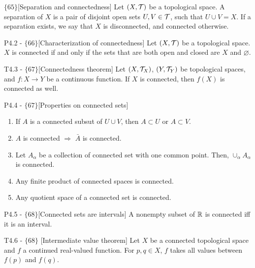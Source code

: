 \documentclass{article}
\begin{document}
\begin{flexidefinition}{$\{65\}$}[Separation and connectedness]
    Let $(X,\mathcal{T})$ be a topological space. A separation of $X$ is a pair of disjoint open sets $U,V \in \mathcal{T}$, such that $U \cup V = X$. If a separation exists, we say that $X$ is disconnected, and connected otherwise.
\end{flexidefinition}
\begin{flexilemma}{P4.2 - $\{66\}$}[Characterization of connectedness]
    Let $(X,\mathcal{T})$ be a topological space. $X$ is connected if and only if the sets that are both open and closed are $X$ and $\varnothing$.
\end{flexilemma}
\begin{flexitheorem}{T4.3 - $\{67\}$}[Connectedness theorem]
    Let $(X,\mathcal{T}_X)$, $(Y,\mathcal{T}_Y)$ be topological spaces, and $f: X \to Y$ be a continuous function. If $X$ is connected, then $f(X)$ is connected as well.
\end{flexitheorem}
\begin{flexilemma}{P4.4 - $\{67\}$}[Properties on connected sets]
    \begin{enumerate}[label=(\alph*)]
        \item If $A$ is a connected subsut of $U\cup V$, then $A\subset U$ or $A \subset V$.
        \item $A$ is connected $\Rightarrow$ $\bar A$ is connected.
        \item Let $A_\alpha$ be a collection of connected set with one common point. Then, $\cup_{\alpha} A_\alpha$ is connected.
        \item Any finite product of connected spaces is connected.
        \item Any quotient space of a connected set is connected.
    \end{enumerate}
\end{flexilemma}

\begin{flexitheorem}{P4.5 - $\{68\}$}[Connected sets are intervals]
    A nonempty subset of $\mathbb{R}$ is connected iff it is an interval.
\end{flexitheorem}

\begin{flexitheorem} {T4.6 - $\{68\}$} [Intermediate value theorem]
    Let $X$ be a connected topological space and $f$ a continued real-valued function. For $p,q \in X$, $f$ takes all values between $f(p)$ and $f(q)$.
\end{flexitheorem}
\end{document}
